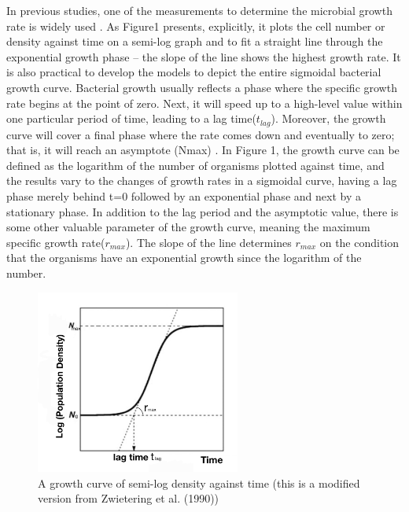 \documentclass[11pt]{article}
\begin{document}
In previous studies, one of the measurements to determine the microbial growth rate is widely used \citep{R6, R10}. As Figure1 presents, explicitly, it plots the cell number or density against time on a semi-log graph and to fit a straight line through the exponential growth phase – the slope of the line shows the highest growth rate. It is also practical to develop the models to depict the entire sigmoidal bacterial growth curve. Bacterial growth usually reflects a phase where the specific growth rate begins at the point of zero. Next, it will speed up to a high-level value within one particular period of time, leading to a lag time($t_{lag}$). Moreover, the growth curve will cover a final phase where the rate comes down and eventually to zero; that is, it will reach an asymptote (Nmax) \citep{R4}. In Figure 1, the growth curve can be defined as the logarithm of the number of organisms plotted against time, and the results vary to the changes of growth rates in a sigmoidal curve, having a lag phase merely behind t=0 followed by an exponential phase and next by a stationary phase. In addition to the lag period and the asymptotic value, there is some other valuable parameter of the growth curve, meaning the maximum specific growth rate($r_{max}$). The slope of the line determines $r_{max}$ on the condition that the organisms have an exponential growth since the logarithm of the number. 

\begin{figure}
\centering 
\includegraphics[width = 0.6\textwidth]{../Code/Materials/figure1.jpg}
      \caption{ A growth curve of semi-log density against time (this is a modified version from Zwietering et al. (1990))}
\end{figure}
\end{document}
